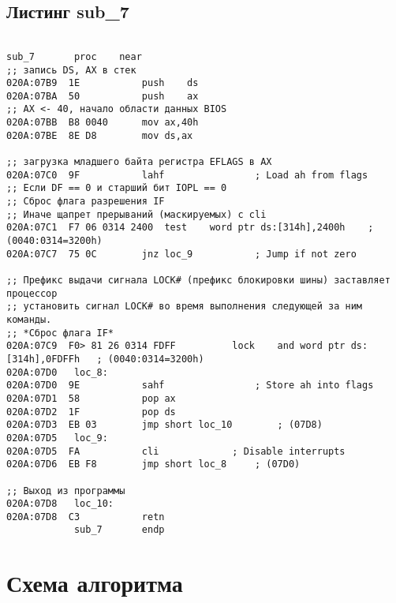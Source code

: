 \subsection*{Листинг sub\_7} 
\begin{lstlisting}[style={asm}]
 
sub_7		proc	near
;; запись DS, AX в стек
020A:07B9  1E			push	ds
020A:07BA  50			push	ax
;; AX <- 40, начало области данных BIOS
020A:07BB  B8 0040		mov	ax,40h
020A:07BE  8E D8		mov	ds,ax
	
;; загрузка младшего байта регистра EFLAGS в AX
020A:07C0  9F			lahf				; Load ah from flags
;; Если DF == 0 и старший бит IOPL == 0
;; Сброс флага разрешения IF
;; Иначе щапрет прерываний (маскируемых) с cli
020A:07C1  F7 06 0314 2400	test	word ptr ds:[314h],2400h	; (0040:0314=3200h)
020A:07C7  75 0C		jnz	loc_9			; Jump if not zero
	
;; Префикс выдачи сигнала LOCK# (префикс блокировки шины) заставляет процессор 
;; установить сигнал LOCK# во время выполнения следующей за ним команды. 
;; *Сброс флага IF*
020A:07C9  F0> 81 26 0314 FDFF          lock	and	word ptr ds:[314h],0FDFFh	; (0040:0314=3200h)
020A:07D0	loc_8:
020A:07D0  9E			sahf				; Store ah into flags
020A:07D1  58			pop	ax
020A:07D2  1F			pop	ds
020A:07D3  EB 03		jmp	short loc_10		; (07D8)
020A:07D5	loc_9:
020A:07D5  FA			cli				; Disable interrupts
020A:07D6  EB F8		jmp	short loc_8		; (07D0)

;; Выход из программы
020A:07D8	loc_10:
020A:07D8  C3			retn
			sub_7		endp
\end{lstlisting}

\clearpage

\section*{Схема алгоритма}





\clearpage


